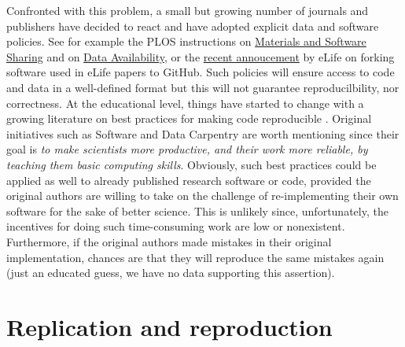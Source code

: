 \documentclass[a4paper,10pt, twocolumn]{article}
\begin{document}
Confronted with this problem, a small but growing number of journals and
publishers have decided to react and have adopted explicit data and software
policies. See for example the PLOS instructions on
\href{http://journals.plos.org/plosone/s/materials-and-software-sharing}{Materials
  and Software Sharing} and
on \href{http://journals.plos.org/plosone/s/data-availability}{Data Availability},
or the
\href{https://elifesciences.org/elife-news/inside-elife-forking-software-used-elife-papers-github}{recent
  annoucement} by eLife on forking software used in eLife papers to GitHub.
Such policies will ensure access to code and data in a well-defined format
\citep{perkel:2016} but this will not guarantee reproducilbility, nor
correctness. At the educational level, things have started to change with a
growing literature on best practices for making code reproducible
\citep{sandve:2013, crook:2013, wilson:2014, halchenko:2015, janz:2015,
  hinsen:2015}. Original initiatives such as Software and Data Carpentry
\citep{wilson:2016} are worth mentioning since their goal is {\em to make
  scientists more productive, and their work more reliable, by teaching them
  basic computing skills}. Obviously, such best practices could be applied as well to already published research software or code, provided the original
authors are willing to take on the challenge of re-implementing their own
software for the sake of better science. This is unlikely since, unfortunately, the
incentives for doing such time-consuming work are low or nonexistent.
Furthermore, if the original authors made mistakes in their original
implementation, chances are that they will reproduce the same mistakes again (just an educated guess, we have no data supporting this
assertion).\\



\section*{Replication and reproduction}
\end{document}
